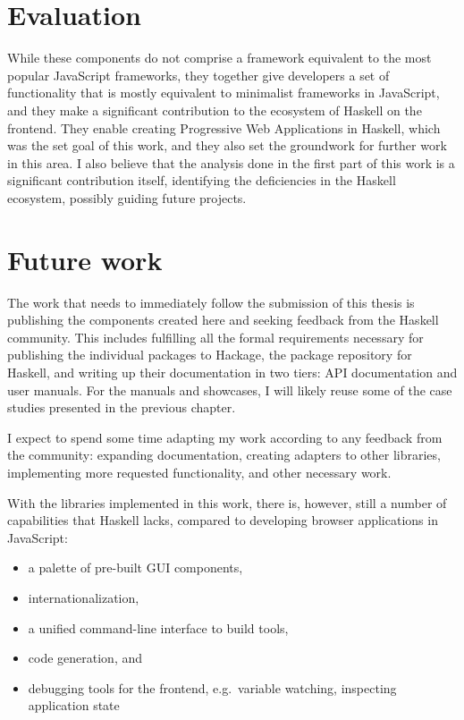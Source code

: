 \documentclass[english,zadani,odsaz]{fitthesis}
\begin{document}
\section{Evaluation}
\label{sec:org14140bf}
While these components do not comprise a framework equivalent to the most
popular JavaScript frameworks, they together give developers a set of
functionality that is mostly equivalent to minimalist frameworks in JavaScript,
and they make a significant contribution to the ecosystem of Haskell on the
frontend. They enable creating Progressive Web Applications in Haskell, which
was the set goal of this work, and they also set the groundwork for further work
in this area. I also believe that the analysis done in the first part of this
work is a significant contribution itself, identifying the deficiencies in the
Haskell ecosystem, possibly guiding future projects.

\section{Future work}
\label{sec:org7990832}
The work that needs to immediately follow the submission of this thesis is
publishing the components created here and seeking feedback from the Haskell
community. This includes fulfilling all the formal requirements necessary for
publishing the individual packages to Hackage, the package repository for
Haskell, and writing up their documentation in two tiers: API documentation and
user manuals. For the manuals and showcases, I will likely reuse some of the
case studies presented in the previous chapter.

I expect to spend some time adapting my work according to any feedback from the
community: expanding documentation, creating adapters to other libraries,
implementing more requested functionality, and other necessary work.

With the libraries implemented in this work, there is, however, still a number of
capabilities that Haskell lacks, compared to developing browser applications in
JavaScript:

\begin{itemize}
\item a palette of pre-built GUI components,
\item internationalization,
\item a unified command-line interface to build tools,
\item code generation, and
\item debugging tools for the frontend, e.g.~variable watching, inspecting application state
\end{itemize}
\end{document}
